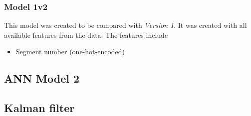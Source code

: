

\subsubsection{Model 1v2}
This model was created to be compared with \textit{Version 1}. It was created with all available features from the data. The features include

\begin{itemize}
    \item Segment number (one-hot-encoded)  
\end{itemize}
  

\subsection{ANN Model 2}



\subsection{Kalman filter}



